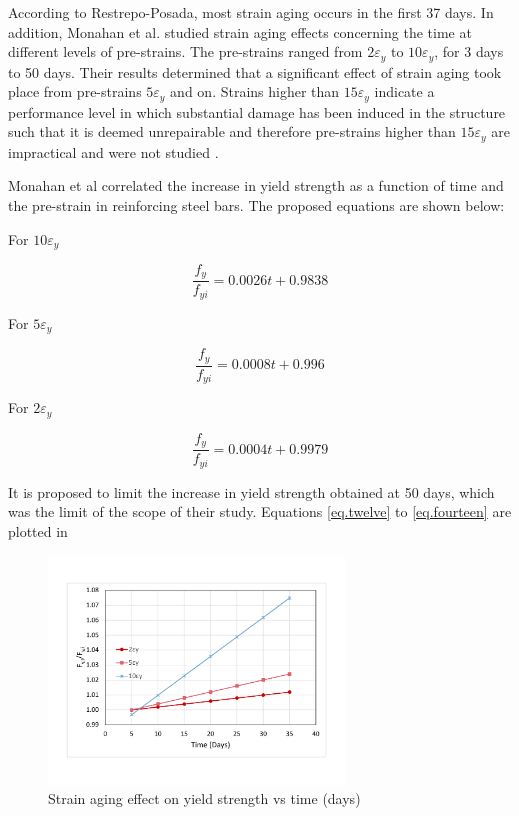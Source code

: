 According to Restrepo-Posada\cite{Restrepo-Posada1994}, most strain aging occurs in the first 37 days. In addition, Monahan et al. \cite{Momtahan2009} studied strain aging effects concerning the time at different levels of pre-strains. The pre-strains ranged from $2\varepsilon_y $ to $10\varepsilon_y$, for 3 days to 50 days. Their results determined that a significant effect of strain aging took place from pre-strains $5\varepsilon_y$ and on. Strains higher than $15\varepsilon_y$ indicate a performance level in which substantial damage has been induced in the structure such that it is deemed unrepairable and therefore pre-strains higher than $15\varepsilon_y$ are impractical and were not studied \cite{Momtahan2009}.

Monahan et al correlated the increase in yield strength as a function of time and the pre-strain in reinforcing steel bars. The proposed equations are shown below:

For $10\varepsilon_y$

\begin{equation}
  \frac{f_y}{f_{yi}}=0.0026t+0.9838
  \label{eq.twelve}
\end{equation} 

For $5\varepsilon_y$

\begin{equation}
  \frac{f_y}{f_{yi}}=0.0008t+0.996
  \label{eq.thirteen}
\end{equation} 

For $2\varepsilon_y$

\begin{equation}
  \frac{f_y}{f_{yi}}=0.0004t+0.9979
  \label{eq.fourteen}
\end{equation} 

It is proposed to limit the increase in yield strength obtained at 50 days, which was the limit of the scope of their study. Equations \ref{eq.twelve} to  \ref{eq.fourteen} are plotted in 

\begin{figure}[htbp]
\centering
\includegraphics[width=0.7\textwidth]{Chapter-2/figs/StrainAging_TimeDependent}
\caption{Strain aging effect on yield strength vs time (days)}
\label{fig:hist4}
\end{figure}

